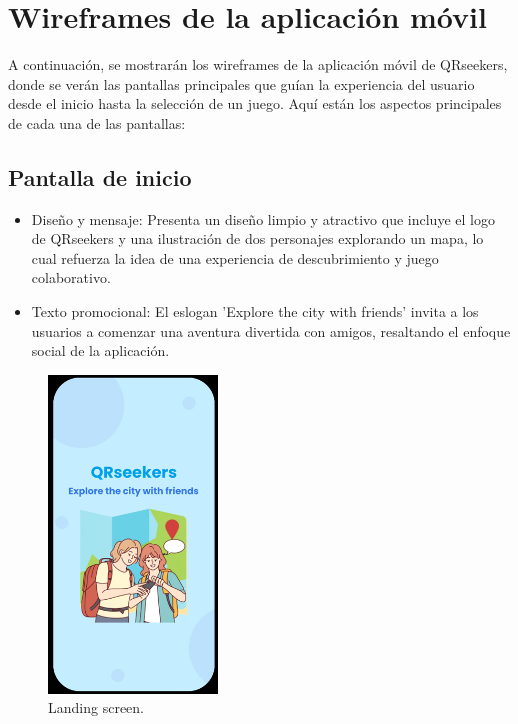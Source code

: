 \documentclass[letterpaper, 12pt]{report}
\begin{document}
\newpage

\section{Wireframes de la aplicación móvil}
A continuación, se mostrarán los wireframes de la aplicación móvil de QRseekers, donde se verán las pantallas principales que guían la experiencia del usuario desde el inicio hasta la selección de un juego. Aquí están los aspectos principales de cada una de las pantallas:

\subsection{Pantalla de inicio}

\begin{itemize}
    \item Diseño y mensaje: Presenta un diseño limpio y atractivo que incluye el logo de QRseekers y una ilustración de dos personajes explorando un mapa, lo cual refuerza la idea de una experiencia de descubrimiento y juego colaborativo.
    \item Texto promocional: El eslogan 'Explore the city with friends' invita a los usuarios a comenzar una aventura divertida con amigos, resaltando el enfoque social de la aplicación.
\end{itemize}

\begin{figure}[H]
\centering
\includegraphics[width=0.4\textwidth]{figure1.png}
\caption{Landing screen.}
\label{fig:1}
\end{figure}
\end{document}
